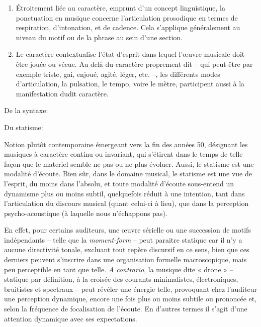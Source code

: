 \documentclass{article}
\newcommand{\myuline}[1]{%
  \uline{\phantom{#1}}%
  \llap{{#1}}%
}
\begin{document}
\begin{enumerate}[resume]

\item \myuline{Ponctuation}

Étroitement liée au caractère,  emprunt d'un concept linguistique, la ponctuation en musique concerne l'articulation prosodique en termes de respiration, d'intonation, et de cadence. Cela s'applique généralement au niveau du motif ou de la phrase au sein d'une section.

\item \myuline{Caractère}

Le caractère contextualise l'état d'esprit dans lequel l'œuvre musicale doit être jouée ou vécue. Au delà du caractère proprement dit -- qui peut être par exemple triste, gai, enjoué, agité, léger, etc. --, les différents modes d'articulation, la pulsation, le tempo, voire le mètre, participent aussi à la manifestation dudit caractère.

\end{enumerate}

\bigskip

De la syntaxe:

\smallskip


\bigskip

Du statisme:

\smallskip 

\noindent Notion plutôt contemporaine émergeant vers la fin des années 50, désignant les musiques à caractère continu ou invariant, qui s'étirent dans le temps de telle façon que le materiel semble ne pas ou ne plus évoluer.  Aussi, le statisme est une modalité d'écoute. 
Bien sûr, dans le domaine musical, le statisme est une vue de l'esprit, du moins dans l'absolu, et toute modalité d'écoute sous-entend un dynamisme plus ou moins subtil, quelquefois réduit à une intention, tant dans l'articulation du discours musical (quant celui-ci à lieu), que dans la perception psycho-acoustique (à laquelle nous n'échappons pas).

En effet, pour certains auditeurs, une œuvre sérielle ou une succession de motifs indépendants -- telle que la \textit{moment-form} -- peut paraitre statique car il n'y a aucune directivité tonale, excluant tout repère discursif en ce sens, bien que ces derniers peuvent s'inscrire dans une organisation formelle macroscopique, mais peu perceptible en tant que telle. \textit{A contrario}, la musique dite « drone »  -- statique par définition, à la croisée des courants minimalistes, électroniques, bruitistes et spectraux -- peut révéler une énergie telle, provoquant chez l'auditeur une perception dynamique, encore une fois plus ou moins subtile ou prononcée et, selon la fréquence de focalisation de l'écoute. En d'autres termes il s'agit d'une attention dynamique avec ses expectations.
\end{document}
